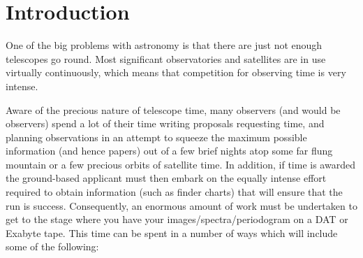 
\stardocabstract
 \newpage
 \begin{latex}
   \setlength{\parskip}{0mm}
   \latexonlytoc
   \setlength{\parskip}{\medskipamount}
   \markboth{\stardocname}{\stardocname}
 \end{latex}
\cleardoublepage
\renewcommand{\thepage}{\arabic{page}}

\setcounter{page}{1}
 
\section{Introduction} 
\label{sec:introduction}

One of the big problems with astronomy is that there are just not enough
telescopes go round. Most significant observatories and satellites are in use
virtually continuously, which means that competition
for observing time is very intense. 

Aware of the precious nature of telescope time, many observers (and would be
observers) spend a lot of their time writing proposals requesting time, and
planning observations in an attempt to squeeze the maximum possible
information (and hence papers) out of a few brief nights atop some far flung
mountain or a few precious orbits of satellite time. In addition, if  
time is awarded the ground-based applicant must then embark on the equally 
intense effort required to obtain information (such as finder charts) that will
ensure that the run is success. Consequently, an enormous amount of work
must be undertaken to get to the stage where you have your 
images/spectra/periodogram on a DAT or Exabyte tape. This time can be spent in a number of
ways which will include some of the following:

